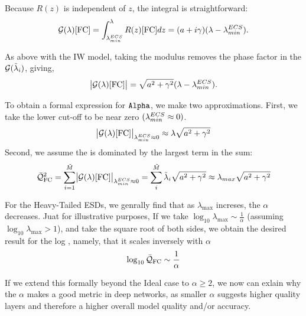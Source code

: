 Because $R(z)$ is independent of $z$, the integral is straightforward:
\begin{equation}
\label{eqn:free_cauchy_G}
\mathcal{G(\lambda)}[\mathrm{FC}] = \int_{\lambda^{ECS}_{min}}^{\lambda} R(z)[\mathrm{FC}]dz = (a + i\gamma)(\lambda - \lambda^{ECS}_{min}).
\end{equation}

As above with the IW model, taking the modulus removes the phase factor in the $\mathcal{G}(\tilde{\lambda}_{i})$, giving,
\begin{equation}
\label{eqn:free_cauchy_G_abs}
\bigl|\mathcal{G(\lambda)}[\mathrm{FC}]\bigr| = \sqrt{a^{2} + \gamma^{2}}(\lambda - \lambda^{ECS}_{min}).
\end{equation}

To obtain a formal expression for $\texttt{Alpha}$, we make two approximations.
First, we take the lower cut-off to be near zero $(\lambda^{ECS}_{min} \approx 0)$.
\begin{equation}
\label{eqn:free_cauchy_G_max}
\bigl|\mathcal{G(\lambda)}[\mathrm{FC}]\bigr|_{\lambda^{ECS}_{min} \approx 0} \approx \lambda\sqrt{a^{2} + \gamma^{2}}
\end{equation}
Second, we assume the \LayerQualitySquared is dominated by the largest term in the sum:
\begin{equation}
\label{eqn:free_cauchy_G_max2}
\bar{\mathcal{Q}}^{2}_{\mathrm{FC}} = \sum_{i=1}^{\tilde{M}}\bigl|\mathcal{G(\lambda)}[\mathrm{FC}]\bigr|_{\lambda^{ECS}_{min} \approx 0}
= \sum_{i}^{\tilde{M}} \tilde{\lambda}_{i}\sqrt{a^{2} + \gamma^{2}} \approx \lambda_{max}\sqrt{a^{2} + \gamma^{2}}
\end{equation}

For the Heavy-Tailed ESDs, we genrally find that as $\lambda_{\max}$ increses, the \HTSR $\alpha$ decreases.
Juat for illustrative purposes,
If we take $\log_{10}\lambda_{\max}\sim\frac{1}{\alpha}$ (assuming $\log_{10}\lambda_{\max}>1$), and take the square root of both sides,
we obtain the desired result for the log \Quality, namely, that it scales inversely with $\alpha$
\begin{equation}
\label{eqn:free_cauchy_Q}
\log_{10}\bar{\mathcal{Q}}_{\mathrm{FC}} \sim \frac{1}{\alpha}
\end{equation}

If we extend this formally beyond the Ideal  case to $\alpha\ge 2$, we now can exlain why the \HTSR $\alpha$
makes a good \LayerQuality metric in deep networks,
as smaller $\alpha$ suggests higher quality layers and therefore a higher overall model quality and/or accuracy. 


